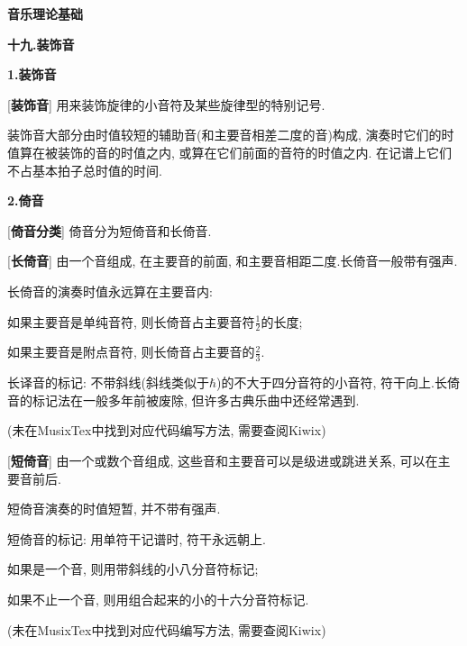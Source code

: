 

\begin{center} 
 \Large \textbf{音乐理论基础}\par
 \textbf{十九.装饰音}
\end{center}

\large 
\begin{center}
 \textbf{1.装饰音}\\
\end{center}

[\textbf{装饰音}] 用来装饰旋律的小音符及某些旋律型的特别记号.\par
\qquad 装饰音大部分由时值较短的辅助音(和主要音相差二度的音)构成, 演奏时它们的时值算在被装饰的音的时值之内, 或算在它们前面的音符的时值之内. 在记谱上它们不占基本拍子总时值的时间.\par

\begin{center}
 \textbf{2.倚音}\\
\end{center}

[\textbf{倚音分类}] 倚音分为短倚音和长倚音.\par

[\textbf{长倚音}] 由一个音组成, 在主要音的前面, 和主要音相距二度.长倚音一般带有强声.\par
\qquad 长倚音的演奏时值永远算在主要音内:\par
\qquad \qquad 如果主要音是单纯音符, 则长倚音占主要音符$\frac{1}{2}$的长度;\par
\qquad \qquad 如果主要音是附点音符, 则长倚音占主要音的$\frac{2}{3}$.\par
\qquad 长译音的标记: 不带斜线(斜线类似于$\hbar$)的不大于四分音符的小音符, 符干向上.长倚音的标记法在一般多年前被废除, 但许多古典乐曲中还经常遇到.\par
\qquad (未在MusixTex中找到对应代码编写方法, 需要查阅Kiwix)\par
\startextract 
\zendextract

[\textbf{短倚音}] 由一个或数个音组成, 这些音和主要音可以是级进或跳进关系, 可以在主要音前后.\par
\qquad 短倚音演奏的时值短暂, 并不带有强声.\par
\qquad 短倚音的标记: 用单符干记谱时, 符干永远朝上. \par
\qquad \qquad 如果是一个音, 则用带斜线的小八分音符标记;\par
\qquad \qquad 如果不止一个音, 则用组合起来的小的十六分音符标记.\par
\qquad (未在MusixTex中找到对应代码编写方法, 需要查阅Kiwix)\par
\startextract 
\zendextract

